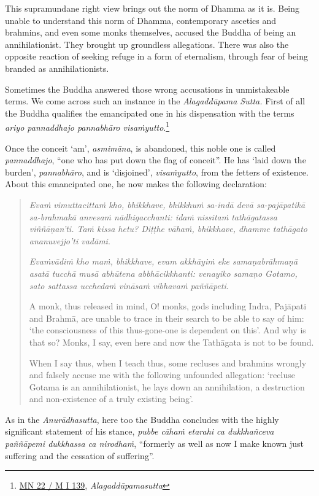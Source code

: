 This supramundane right view brings out the norm of Dhamma as it is. Being unable to understand this norm of Dhamma, contemporary ascetics and brahmins, and even some monks themselves, accused the Buddha of being an annihilationist. They brought up groundless allegations. There was also the opposite reaction of seeking refuge in a form of eternalism, through fear of being branded as annihilationists.

Sometimes the Buddha answered those wrong accusations in unmistakeable terms. We come across such an instance in the \emph{Alagaddūpama Sutta.} First of all the Buddha qualifies the emancipated one in his dispensation with the terms \emph{ariyo pannaddhajo pannabhāro visaṁyutto}.\footnote{\href{https://suttacentral.net/mn22/pli/ms}{MN 22 / M I 139}, \emph{Alagaddūpamasutta}}

Once the conceit `am', \emph{asmimāna}, is abandoned, this noble one is called \emph{pannaddhajo}, ``one who has put down the flag of conceit''. He has `laid down the burden', \emph{pannabhāro}, and is `disjoined', \emph{visaṁyutto}, from the fetters of existence. About this emancipated one, he now makes the following declaration:

\begin{quote}
\emph{Evaṁ vimuttacittaṁ kho, bhikkhave, bhikkhuṁ sa-indā devā sa-pajāpatikā sa-brahmakā anvesaṁ nādhigacchanti: idaṁ nissitaṁ tathāgatassa viññāṇan'ti. Taṁ kissa hetu? Diṭṭhe vāhaṁ, bhikkhave, dhamme tathāgato ananuvejjo'ti vadāmi}.

\emph{Evaṁvādiṁ kho maṁ, bhikkhave, evam akkhāyiṁ eke samaṇabrāhmaṇā asatā tucchā musā abhūtena abbhācikkhanti: venayiko samaṇo Gotamo, sato sattassa ucchedaṁ vināsaṁ vibhavaṁ paññāpeti}.

A monk, thus released in mind, O! monks, gods including Indra, Pajāpati and Brahmā, are unable to trace in their search to be able to say of him: `the consciousness of this thus-gone-one is dependent on this'. And why is that so? Monks, I say, even here and now the Tathāgata is not to be found.

When I say thus, when I teach thus, some recluses and brahmins wrongly and falsely accuse me with the following unfounded allegation: `recluse Gotama is an annihilationist, he lays down an annihilation, a destruction and non-existence of a truly existing being'.
\end{quote}

As in the \emph{Anurādhasutta}, here too the Buddha concludes with the highly significant statement of his stance, \emph{pubbe cāhaṁ etarahi ca dukkhañceva paññāpemi dukkhassa ca nirodhaṁ}, ``formerly as well as now I make known just suffering and the cessation of suffering''.

